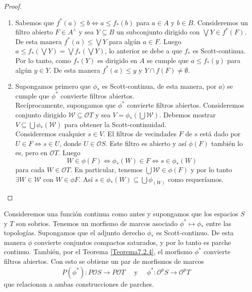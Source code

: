\begin{proof}
    \begin{enumerate}
        \item Sabemos que $f^*(a)\leq b\Leftrightarrow a\leq f_*(b)$ para $a\in A$ y $b\in B$. Consideremos un filtro abierto $F\in A^\wedge$ y sea $Y\subseteq B$ un subconjunto dirigido con $\bigvee Y\in f^*(F)$. De esta manera $f^*(a)\leq \bigvee Y$ para algún $a\in F$. Luego $a\leq f_*(\bigvee Y)=\bigvee f_*(\bigvee Y)$, lo anterior se debe a que $f_*$ es Scott-continua.\\

        Por lo tanto, como $f_*(Y)$ es dirigido en $A$ se cumple que $a\leq f_*(y)$ para algún $y\in Y$. De esta manera $f^*(a)\leq y$ y $Y\cap f(F)\neq \emptyset$.

        \item Supongamos primero que $\phi_*$ es Scott-continua, de esta manera, por $a)$ se cumple que $\phi^*$ convierte filtros abiertos.\\

        Recíprocamente, supongamos que $\phi^*$ convierte filtros abiertos. Consideremos conjunto dirigido $\mathcal{W}\subseteq \mathcal{O}T$ y sea $V=\phi_*(\bigcup  \mathcal{W})$. Debemos mostrar $V\subseteq \bigcup \phi_*(\mathcal{W})$ para obtener la Scott-continuidad.\\

        Consideremos cualquier $s\in V$. El filtros de vecindades $F$ de $s$ está dado por $U\in F\Leftrightarrow s\in U$, donde $U\in \mathcal{O}S$. Este filtro es abierto y así $\phi(F)$ también lo es, pero en $\mathcal{O}T$. Luego
        \[
        W\in \phi(F)\Leftrightarrow \phi_*(W)\in F\Leftrightarrow s\in \phi_*(W)
        \]
        para cada $W\in \mathcal{O}T$. En particular, tenemos $\bigcup \mathcal{W}\in \phi(F)$ y por lo tanto $\exists W\in \mathcal{W}$ con $W\in \phi F$. Así $s\in \phi_*(W)\subseteq \bigcup \phi_(W)$ como requeríamos. 
    \end{enumerate}
\end{proof}

Consideremos una función continua como antes y supongamos que los espacios $S$ y $T$ son sobrios. Tenemos un morfismo de marcos asociado $\phi^*\mapsto \phi_*$ 
entre las topologías. Supongamos que el adjunto derecho $\phi_*$ es Scott-continuo. De esta manera $\phi$ convierte conjuntos compactos saturados, y por lo tanto 
es parche continuo. También, por el Teorema \ref{Teorema7.2.4}, el morfismo $\phi^*$ convierte filtros abiertos. Con esto se obtiene un par de morfismos de marcos 
\[
P(\phi^*)\colon P\mathcal{O}S\to P\mathcal{O}T\quad \mbox{ y } \quad \phi^*\colon \mathcal{O}^pS\to \mathcal{O}^pT
\]
que relacionan a ambas construcciones de parches.


